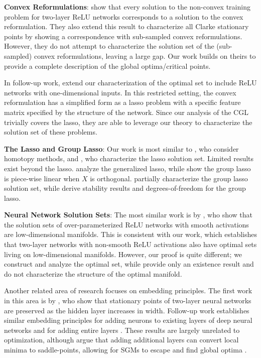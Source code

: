 
\textbf{Convex Reformulations}:
\citet{wang2022hidden} show that every solution to the non-convex training
problem for two-layer ReLU networks corresponds to a solution to the
convex reformulation.
They also extend this result to characterize all Clarke stationary points by
showing a correspondence with sub-sampled convex reformulations.
However, they do not attempt to characterize the solution set of the
(sub-sampled) convex reformulations, leaving a large gap.
Our work builds on theirs to provide a complete description of the global
optima/critical points.

In follow-up work, \citet{zeger2024mirrors} extend our characterization
of the optimal set to include ReLU networks with one-dimensional inputs.
In this restricted setting, the convex reformulation has a simplified form
as a lasso problem with a specific feature matrix specified by the structure of
the network.
Since our analysis of the CGL trivially covers the lasso, they are able to
leverage our theory to characterize the solution set of these problems.

\textbf{The Lasso and Group Lasso}:
Our work is most similar to \citet{hastie2007forward},
who consider homotopy methods, and
\citet{tibshirani2013unique}, who characterize the lasso solution set.
Limited results exist beyond the lasso.
\citet{tibshirani2011solution} analyze the generalized lasso,
while \citet{yuan2006model} show the group lasso is piece-wise linear
when \( X \) is orthogonal.
\citet{roth2008group} partially characterize the group lasso solution set,
while \citet{vaiter2012dof} derive stability results and degrees-of-freedom
for the group lasso.

\textbf{Neural Network Solution Sets}:
The most similar work is by \citet{cooper2021global}, who show that the
solution sets of over-parameterized ReLU networks with smooth activations are
low-dimensional manifolds.
This is consistent with our work, which establishes that two-layer networks
with non-smooth ReLU activations also have optimal sets living on
low-dimensional manifolds.
However, our proof is quite different;
we construct and analyze the optimal set, while \citet{cooper2021global}
provide only an existence result and do not characterize the structure of the
optimal manifold.

Another related area of research focuses on embedding principles.
The first work in this area is by \citet{fukumizu2000plateau}, who show
that stationary points of two-layer neural networks are preserved as the
hidden layer increases in width.
Follow-up work establishes similar embedding principles for adding neurons to
existing layers of deep neural networks \citep{zhang2021embedding} and for
adding entire layers \citep{bai2022depth}.
These results are largely unrelated to optimization, although
\citet{bai2022depth} argue that adding additional layers can convert local
minima to saddle-points, allowing for SGMs to escape and find global optima
\citep{lee2016escape}.


